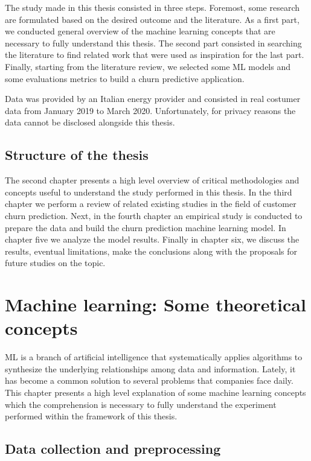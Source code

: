 \documentclass[LaM,binding=0.6cm, english]{sapthesis}
\begin{document}
The study made in this thesis consisted in three steps. Foremost, some research are formulated based on the desired outcome and the literature. As a first part, we conducted general overview of the machine learning concepts that are necessary to fully understand this thesis. The second part consisted in searching the literature to find related work that were used as inspiration for the last part. Finally, starting from the literature review, we selected some \gls{ML} models and some evaluations metrics to build a churn predictive application.

Data was provided by an Italian energy provider and consisted in real costumer data from January 2019 to March 2020. Unfortunately, for privacy reasons the data cannot be disclosed alongside this thesis.

\section{Structure of the thesis}

The second chapter presents a high level overview of critical methodologies and concepts useful to understand the study performed in this thesis. In the third chapter we perform a review of related existing studies in the field of customer churn prediction. Next, in the fourth chapter an empirical study is conducted to prepare the data and build the churn prediction machine learning model. In chapter five we analyze the model results. Finally in chapter six, we discuss the results, eventual limitations, make the conclusions along with the proposals for future studies on the topic.

\chapter{Machine learning: Some theoretical concepts}

\gls{ML} is a branch of artificial intelligence that systematically applies algorithms to synthesize the underlying relationships among data and information.\cite{Awad2015} Lately, it has become a common solution to several problems that companies face daily. This chapter presents a high level explanation of some machine learning concepts which the comprehension is necessary to fully understand the experiment performed within the framework of this thesis.

\section{Data collection and preprocessing}
\end{document}
